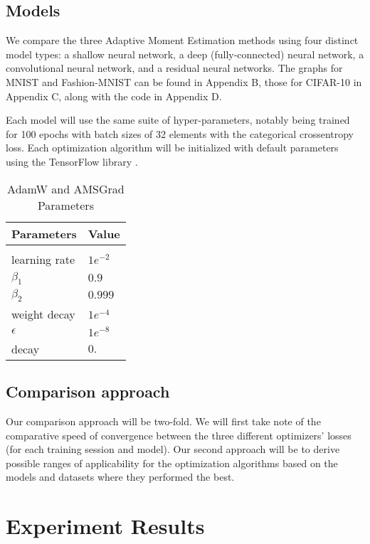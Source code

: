 \documentclass{article} %
\begin{document}
\subsection{Models}

We compare the three Adaptive Moment Estimation methods using four distinct model types: a shallow 
neural network, a deep (fully-connected) neural network, a convolutional neural network, and
a residual neural networks. The graphs for MNIST and Fashion-MNIST can be found in Appendix B, those 
for CIFAR-10 in Appendix C, along with the code in Appendix D.

Each model will use the same suite of hyper-parameters, notably being trained for 100 epochs
with batch sizes of 32 elements with the categorical crossentropy loss. Each optimization 
algorithm will be initialized with default parameters using the TensorFlow library 
\citep{45166}.

\begin{table}[t]
\caption{AdamW and AMSGrad Parameters}
\label{sample-table}
\begin{center}
\begin{tabular}{ll}
\multicolumn{1}{c}{\bf Parameters}  &\multicolumn{1}{c}{\bf Value}
\\ \hline \\
learning rate & $1e^{-2}$ \\
$\beta_1$ & $0.9$ \\
$\beta_2$ & $0.999$ \\
weight decay & $1e^{-4}$ \\
$\epsilon$ & $1e^{-8}$ \\
decay & $0.$
\end{tabular}
\end{center}
\end{table}

\subsection{Comparison approach}

Our comparison approach will be two-fold. We will first take note of the comparative speed of convergence 
between the three different optimizers' losses (for each training session and model). Our second 
approach will be to derive possible ranges of applicability for the optimization algorithms 
based on the models and datasets where they performed the best.

\section{Experiment Results}
\label{results}
\end{document}
